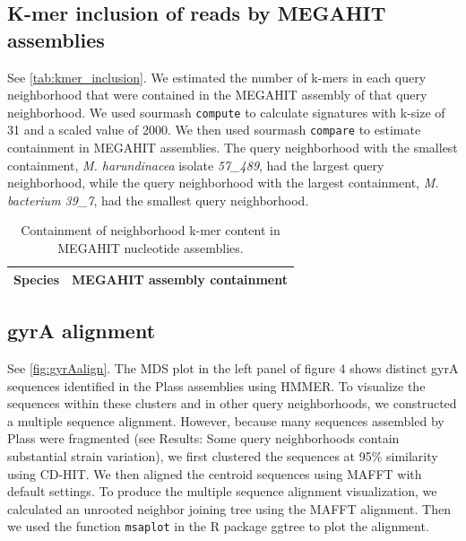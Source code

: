 \subsection{K-mer inclusion of reads by MEGAHIT assemblies}
\label{subsec:inclusion}

See \autoref{tab:kmer_inclusion}. We estimated the number of k-mers in each
query neighborhood that were contained in the MEGAHIT assembly of that query
neighborhood. We used sourmash {\tt compute} to calculate signatures with k-size of
31 and a scaled value of 2000. We then used sourmash {\tt compare} to estimate
containment in MEGAHIT assemblies. The query neighborhood with the smallest
containment, \emph{M. harundinacea} isolate \emph{57\_489}, had the largest query
neighborhood, while the query neighborhood with the largest containment,
\emph{M. bacterium 39\_7}, had the smallest query neighborhood.

\begin{table}
  \begin{tabular}{l c}
    \toprule
    Species & MEGAHIT assembly containment \\
    \midrule
    
%    
    \bottomrule
  \end{tabular}
  \caption{Containment of neighborhood k-mer content in MEGAHIT nucleotide assemblies.}
  \label{tab:kmer_inclusion}
\end{table}

\subsection{gyrA alignment}
\label{subsec:gyrAalign}

See \autoref{fig:gyrAalign}. The MDS plot in the left panel of figure 4 shows
distinct gyrA sequences identified in the Plass assemblies using HMMER. To visualize
the sequences within these clusters and in other query neighborhoods, we
constructed a multiple sequence alignment. However, because many
sequences assembled by Plass were fragmented (see Results: Some query neighborhoods
contain substantial strain variation), we first clustered the sequences at 95\%
similarity using CD-HIT. We then aligned the centroid sequences using MAFFT with
default settings. To produce the multiple sequence alignment visualization, we
calculated an unrooted neighbor joining tree using the MAFFT alignment. Then we used
the function {\tt msaplot} in the R package ggtree to plot the alignment.

